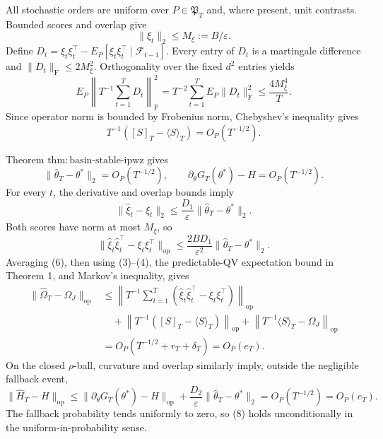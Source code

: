 All stochastic orders are uniform over \(P\in\mathfrak P_T\) and, where present, unit contrasts. Bounded scores and overlap give
\[
 \|\xi_t\|_2\le M_\xi:=B/\varepsilon. \tag{1}
\]
Define \(D_t=\xi_t\xi_t^\top-E_P[\xi_t\xi_t^\top\mid\mathcal F_{t-1}]\). Every entry of \(D_t\) is a martingale difference and \(\|D_t\|_{\mathrm F}\le2M_\xi^2\). Orthogonality over the fixed \(d^2\) entries yields
\[
 E_P\left\|T^{-1}\sum_{t=1}^TD_t\right\|_{\mathrm F}^2
 =T^{-2}\sum_{t=1}^TE_P\|D_t\|_{\mathrm F}^2
 \le\frac{4M_\xi^4}{T}. \tag{2}
\]
Since operator norm is bounded by Frobenius norm, Chebyshev's inequality gives
\[
 T^{-1}([S]_T-\langle S\rangle_T)=O_P(T^{-1/2}). \tag{3}
\]

Theorem \(\mathrm{thm:basin\text{-}stable\text{-}ipwz}\) gives
\[
 \|\widehat\theta_T-\theta^*\|_2=O_P(T^{-1/2}),
 \qquad \partial_\theta G_T(\theta^*)-H=O_P(T^{-1/2}). \tag{4}
\]
For every \(t\), the derivative and overlap bounds imply
\[
 \|\widehat\xi_t-\xi_t\|_2
 \le\frac{D_1}{\varepsilon}\|\widehat\theta_T-\theta^*\|_2. \tag{5}
\]
Both scores have norm at most \(M_\xi\), so
\[
 \|\widehat\xi_t\widehat\xi_t^\top-\xi_t\xi_t^\top\|_{\mathrm{op}}
 \le\frac{2BD_1}{\varepsilon^2}\|\widehat\theta_T-\theta^*\|_2. \tag{6}
\]
Averaging (6), then using (3)--(4), the predictable-QV expectation bound in Theorem 1, and Markov's inequality, gives
\[
\begin{aligned}
 \|\widehat\Omega_T-\Omega_J\|_{\mathrm{op}}
 &\le\left\|T^{-1}\sum_{t=1}^T
 (\widehat\xi_t\widehat\xi_t^\top-\xi_t\xi_t^\top)\right\|_{\mathrm{op}}\\
 &\quad+\left\|T^{-1}([S]_T-\langle S\rangle_T)\right\|_{\mathrm{op}}
 +\left\|T^{-1}\langle S\rangle_T-\Omega_J\right\|_{\mathrm{op}}\\
 &=O_P(T^{-1/2}+r_T+\delta_T)=O_P(e_T).
\end{aligned}\tag{7}
\]
On the closed \(\rho\)-ball, curvature and overlap similarly imply, outside the negligible fallback event,
\[
 \|\widehat H_T-H\|_{\mathrm{op}}
 \le\|\partial_\theta G_T(\theta^*)-H\|_{\mathrm{op}}
 +\frac{D_2}{\varepsilon}\|\widehat\theta_T-\theta^*\|_2
 =O_P(T^{-1/2})=O_P(e_T). \tag{8}
\]
The fallback probability tends uniformly to zero, so (8) holds unconditionally in the uniform-in-probability sense.

